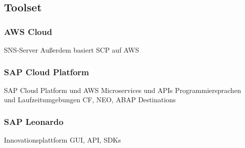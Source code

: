 \subsection{Toolset}

\subsubsection{AWS Cloud}
SNS-Server
Außerdem basiert SCP auf AWS
\subsubsection{SAP Cloud Platform}

SAP Cloud Platform und AWS Microservices und APIs
Programmiersprachen und Laufzeitumgebungen
CF, NEO, ABAP
Destinations

\subsubsection{SAP Leonardo}
Innovationsplattform
GUI, API, SDKs



\newpage
